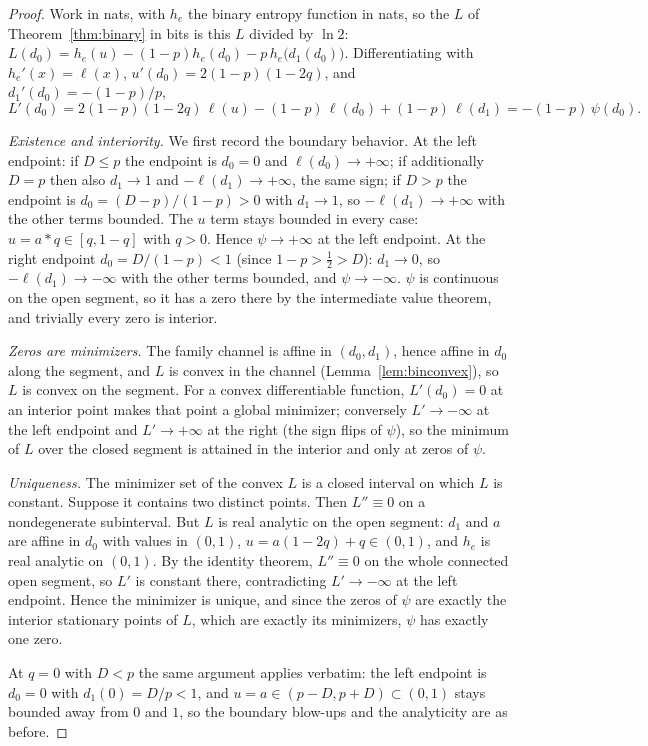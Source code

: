 \documentclass[11pt,onecolumn]{IEEEtran}
\begin{document}
\begin{proof}
Work in nats, with $h_e$ the binary entropy function in nats, so the
$L$ of Theorem~\ref{thm:binary} in bits is this $L$ divided by $\ln2$:
$L(d_0)=h_e(u)-(1-p)h_e(d_0)-p\,h_e\bigl(d_1(d_0)\bigr)$. Differentiating
with $h_e'(x)=\ell(x)$, $u'(d_0)=2(1-p)(1-2q)$, and $d_1'(d_0)=-(1-p)/p$,
\[
L'(d_0)=2(1-p)(1-2q)\,\ell(u)-(1-p)\,\ell(d_0)+(1-p)\,\ell(d_1)
=-(1-p)\,\psi(d_0).
\]

\emph{Existence and interiority.} We first record the boundary
behavior. At the left
endpoint: if $D\le p$ the endpoint is $d_0=0$ and
$\ell(d_0)\to+\infty$; if additionally $D=p$ then also $d_1\to1$ and
$-\ell(d_1)\to+\infty$, the same sign; if $D>p$ the endpoint is
$d_0=(D-p)/(1-p)>0$ with $d_1\to1$, so $-\ell(d_1)\to+\infty$ with the
other terms bounded. The $u$ term stays bounded in every case:
$u=a*q\in[q,1-q]$ with $q>0$. Hence $\psi\to+\infty$ at the left
endpoint. At the right endpoint $d_0=D/(1-p)<1$ (since $1-p>\tfrac12>D$):
$d_1\to0$, so $-\ell(d_1)\to-\infty$ with the other terms bounded, and
$\psi\to-\infty$. $\psi$ is continuous on the open segment, so it has a
zero there by the intermediate value theorem, and trivially every zero
is interior.

\emph{Zeros are minimizers.} The family channel is affine in
$(d_0,d_1)$, hence affine in $d_0$ along the segment, and
$L$ is convex in the channel (Lemma~\ref{lem:binconvex}), so $L$ is
convex on the segment. For
a convex differentiable function, $L'(d_0)=0$ at an interior point
makes that point a global minimizer; conversely
$L'\to-\infty$ at the left endpoint and $L'\to+\infty$ at the right
(the sign flips of $\psi$), so the minimum of $L$ over the closed
segment is attained in the interior and only at zeros of $\psi$.

\emph{Uniqueness.} The minimizer set of the convex $L$ is a closed
interval on which $L$ is constant. Suppose it contains two distinct
points. Then $L''\equiv0$ on a nondegenerate subinterval. But $L$ is
real analytic on the open segment: $d_1$ and $a$ are affine in $d_0$
with values in $(0,1)$, $u=a(1-2q)+q\in(0,1)$, and $h_e$ is real analytic
on $(0,1)$. By the identity theorem, $L''\equiv0$ on the whole
connected open segment, so $L'$ is constant there, contradicting
$L'\to-\infty$ at the left endpoint. Hence the minimizer is unique, and
since the zeros of $\psi$ are exactly the interior stationary points of
$L$, which are exactly its minimizers, $\psi$ has exactly one zero.

At $q=0$ with $D<p$ the same argument applies verbatim: the left
endpoint is $d_0=0$ with $d_1(0)=D/p<1$, and $u=a\in(p-D,p+D)\subset
(0,1)$ stays bounded away from $0$ and $1$, so the boundary blow-ups
and the analyticity are as before.
\end{proof}
\end{document}
